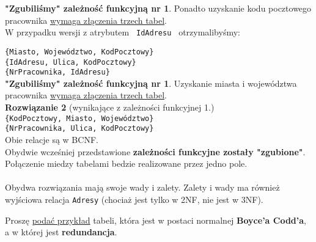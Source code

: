 \textbf{"Zgubiliśmy" zależność funkcyjną nr 1}. Ponadto uzyskanie kodu
pocztowego\\ pracownika \underline{wymaga złączenia trzech tabel}.\\

W przypadku wersji z atrybutem \texttt{ IdAdresu } otrzymalibyśmy:

\texttt{\{Miasto, Województwo, {\color{blue}\faKey}KodPocztowy\}}\\
\texttt{\{{\color{red}\faKey}IdAdresu, {\color{blue}\faKey}Ulica,
{\color{blue}\faKey}KodPocztowy\}}\\
\texttt{\{{\color{green}\faKey}NrPracownika, IdAdresu\}}\\

\textbf{"Zgubiliśmy" zależność funkcyjną nr 1}. Uzyskanie miasta i województwa
pracownika \underline{wymaga złączenia trzech tabel}.\\

\textbf{Rozwiązanie 2} (wynikające z zależności funkcyjnej 1.)\\

\texttt{\{{\color{green}\faKey}KodPocztowy, Miasto, Województwo\}}\\
\texttt{\{{\color{green}\faKey}NrPracownika, Ulica, KodPocztowy\}}\\

Obie relacje są w BCNF.\\
Obydwie wcześniej przedstawione \textbf{zależności funkcyjne zostały
"zgubione"}.
Połączenie miedzy tabelami bedzie realizowane przez jedno pole.\\\\

Obydwa rozwiązania mają swoje wady i zalety. Zalety i wady ma również
wyjściowa relacja \texttt{Adresy} (chociaż jest tylko w 2NF, nie jest w
3NF).

\pagebreak

\horrule{0.5pt}
Proszę \underline{podać przykład} tabeli, która jest w postaci normalnej
\textbf{Boyce’a Codd’a}, a w której jest \textbf{redundancja}.\\
\horrule{0.5pt}

\vskip 0.5cm

